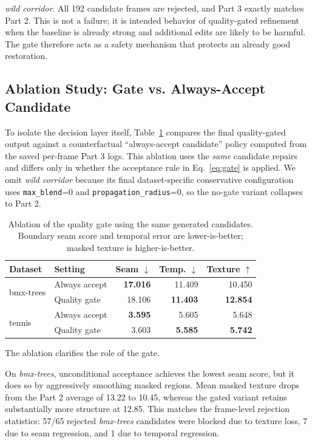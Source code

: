 \documentclass[10pt,twocolumn,letterpaper]{article}
\begin{document}
\textit{wild corridor}. All 192 candidate frames are rejected, and Part 3 exactly matches Part 2. This is not a failure; it is intended behavior of quality-gated refinement when the baseline is already strong and additional edits are likely to be harmful. The gate therefore acts as a safety mechanism that protects an already good restoration.

\subsection{Ablation Study: Gate vs. Always-Accept Candidate}
To isolate the decision layer itself, Table~\ref{tab:ablation} compares the final quality-gated output against a counterfactual ``always-accept candidate'' policy computed from the saved per-frame Part 3 logs. This ablation uses the \emph{same} candidate repairs and differs only in whether the acceptance rule in Eq.~\ref{eq:gate} is applied. We omit \textit{wild corridor} because its final dataset-specific conservative configuration uses \texttt{max\_blend}=0 and \texttt{propagation\_radius}=0, so the no-gate variant collapses to Part 2.

\begin{table}[t]
\centering
\scriptsize
\caption{Ablation of the quality gate using the same generated candidates. Boundary seam score and temporal error are lower-is-better; masked texture is higher-is-better.}
\label{tab:ablation}
\begin{tabular}{llrrr}
\toprule
Dataset & Setting & Seam $\downarrow$ & Temp. $\downarrow$ & Texture $\uparrow$ \\
\midrule
\multirow{2}{*}{bmx-trees}
& Always accept & \textbf{17.016} & 11.409 & 10.450 \\
& Quality gate & 18.106 & \textbf{11.403} & \textbf{12.854} \\
\midrule
\multirow{2}{*}{tennis}
& Always accept & \textbf{3.595} & 5.605 & 5.648 \\
& Quality gate & 3.603 & \textbf{5.585} & \textbf{5.742} \\
\bottomrule
\end{tabular}
\end{table}

The ablation clarifies the role of the gate.

On \textit{bmx-trees}, unconditional acceptance achieves the lowest seam score, but it does so by aggressively smoothing masked regions. Mean masked texture drops from the Part 2 average of 13.22 to 10.45, whereas the gated variant retains substantially more structure at 12.85. This matches the frame-level rejection statistics: 57/65 rejected \textit{bmx-trees} candidates were blocked due to texture loss, 7 due to seam regression, and 1 due to temporal regression.
\end{document}
